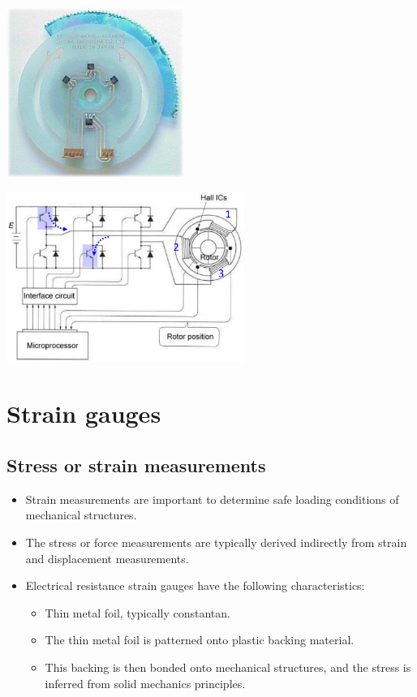 \documentclass[11pt]{article}
\begin{document}
\begin{center}
\includegraphics[height=15em]{./images/brushless-dc-motor-hall-effect-sensor.png}
\end{center}

\begin{center}
\includegraphics[height=15em]{./images/brushless-dc-motor-circuit-diagram.png}
\end{center}

 \newpage
\section{Strain gauges}
\label{sec:orgd3477e9}

\subsection{Stress or strain measurements}
\label{sec:org379448b}
\begin{itemize}
\item Strain measurements are important to determine safe loading conditions of mechanical structures.
\item The stress or force measurements are typically derived indirectly from strain and displacement measurements.
\item Electrical resistance strain gauges have the following characteristics:
\begin{itemize}
\item Thin metal foil, typically constantan.
\item The thin metal foil is patterned onto plastic backing material.
\item This backing is then bonded onto mechanical structures, and the stress is inferred from solid mechanics principles.
\end{itemize}
\end{itemize}
\end{document}
